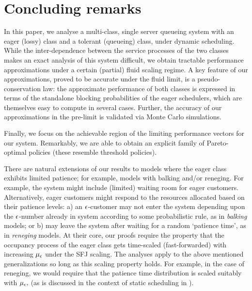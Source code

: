  








\section{Concluding remarks}
\label{sec:conclusion}

In this paper, we analyse a multi-class, single server queueing system
with an eager (lossy) class and a tolerant (queueing) class, under
dynamic scheduling. While the inter-dependence between the service
processes of the two classes makes an exact analysis of this system
difficult, we obtain tractable performance approximations under a
certain (partial) fluid scaling regime. A key feature of our
approximations, proved to be accurate under the  fluid limit,  is a pseudo-conservation law:  the  approximate performance
of both classes is expressed in terms of the standalone blocking
probabilities of the eager schedulers, which are themselves easy to
compute in several cases. 
Further,  the accuracy of our approximations in the pre-limit is validated  via Monte Carlo
simulations.

Finally, we focus on the achievable region
of the limiting performance vectors for our system.
Remarkably, we are able to obtain an explicit family of Pareto-optimal
policies (these resemble  threshold  policies).

There are natural extensions of our results to models where the eager
class exhibits limited patience; for example, models with balking
and/or reneging. For example, the system might include (limited)
waiting room for eager customers.  Alternatively, eager customers
might respond to the resources allocated based on their patience
levels: a) an ${ \epsilon }$-customer may not enter the system depending upon
the ${ \epsilon }$-number already in system according to some probabilistic
rule, as in {\it balking} models; or b) may leave the system after
waiting for a random `patience time', as in {\it reneging} models. At
their core, our proofs require the property that the occupancy process
of the eager class gets time-scaled (fast-forwarded) with increasing
${\mu_\epsilon}$ under the SFJ scaling. The analyses apply to the above
mentioned generalizations so long as this scaling property holds. For
example, in the case of reneging, we would require that the patience
time distribution is scaled suitably with ${\mu_\epsilon},$ (as is discussed in
the context of static scheduling in \cite{ANOR}).

